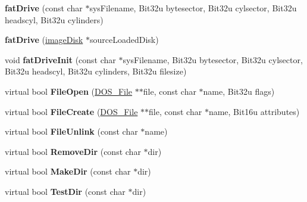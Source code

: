 \begin{DoxyCompactItemize}
\item 
\hypertarget{classfatDrive_a914f62f083ce6eddfad1b5134b1126c6}{{\bfseries fat\-Drive} (const char $\ast$sys\-Filename, Bit32u bytesector, Bit32u cylsector, Bit32u headscyl, Bit32u cylinders)}\label{classfatDrive_a914f62f083ce6eddfad1b5134b1126c6}

\item 
\hypertarget{classfatDrive_a91d1fe4018933b8e2127a71c38c1a711}{{\bfseries fat\-Drive} (\hyperlink{classimageDisk}{image\-Disk} $\ast$source\-Loaded\-Disk)}\label{classfatDrive_a91d1fe4018933b8e2127a71c38c1a711}

\item 
\hypertarget{classfatDrive_a25cf0753ba037255c228dec274b096db}{void {\bfseries fat\-Drive\-Init} (const char $\ast$sys\-Filename, Bit32u bytesector, Bit32u cylsector, Bit32u headscyl, Bit32u cylinders, Bit32u filesize)}\label{classfatDrive_a25cf0753ba037255c228dec274b096db}

\item 
\hypertarget{classfatDrive_a2b7f5898cbfdf595b07b0c0c7da86c10}{virtual bool {\bfseries File\-Open} (\hyperlink{classDOS__File}{D\-O\-S\-\_\-\-File} $\ast$$\ast$file, const char $\ast$name, Bit32u flags)}\label{classfatDrive_a2b7f5898cbfdf595b07b0c0c7da86c10}

\item 
\hypertarget{classfatDrive_ac070fec3dd29d777417aae60bd7c6081}{virtual bool {\bfseries File\-Create} (\hyperlink{classDOS__File}{D\-O\-S\-\_\-\-File} $\ast$$\ast$file, const char $\ast$name, Bit16u attributes)}\label{classfatDrive_ac070fec3dd29d777417aae60bd7c6081}

\item 
\hypertarget{classfatDrive_a2269b9f78159262ff4432e83ad3eaad3}{virtual bool {\bfseries File\-Unlink} (const char $\ast$name)}\label{classfatDrive_a2269b9f78159262ff4432e83ad3eaad3}

\item 
\hypertarget{classfatDrive_a63690cccb8a79e395174725f3f178773}{virtual bool {\bfseries Remove\-Dir} (const char $\ast$dir)}\label{classfatDrive_a63690cccb8a79e395174725f3f178773}

\item 
\hypertarget{classfatDrive_a3529c8adc85f6c6a1d8c2fd4156bcbae}{virtual bool {\bfseries Make\-Dir} (const char $\ast$dir)}\label{classfatDrive_a3529c8adc85f6c6a1d8c2fd4156bcbae}

\item 
\hypertarget{classfatDrive_a3be370f09c1c3a5c88381b86d180c627}{virtual bool {\bfseries Test\-Dir} (const char $\ast$dir)}\label{classfatDrive_a3be370f09c1c3a5c88381b86d180c627}


\end{DoxyCompactItemize}
